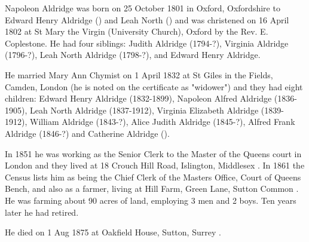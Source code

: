 
Napoleon Aldridge was born on 25 October 1801 in Oxford, Oxfordshire to Edward Henry Aldridge () and Leah North () \cite{NapoleonAldridgeBirth} and was christened on 16 April 1802 at St Mary the Virgin (University Church), Oxford by the Rev. E. Coplestone.  He had four siblings:  Judith Aldridge (1794-?), Virginia Aldridge (1796-?), Leah North Aldridge (1798-?), and Edward Henry Aldridge.

He married Mary Ann Chymist on 1 April 1832 at St Giles in the Fields, Camden, London \cite{NapoleonAldridgeMarriage}  (he is noted on the certificate as "widower") and they had eight children:  Edward Henry Aldridge (1832-1899),  Napoleon Alfred Aldridge (1836-1905), Leah North Aldridge (1837-1912), Virginia Elizabeth Aldridge (1839-1912), William Aldridge (1843-?), Alice Judith Aldridge (1845-?), Alfred Frank Aldridge (1846-?) and Catherine Aldridge ().

In 1851 he was working as the Senior Clerk to the Master of the Queens court in London and they lived at 18 Crouch Hill Road, Islington, Middlesex \cite{NapoleonAldridgeOccupation}.  In 1861 the Census lists him as being the Chief Clerk of the Masters Office, Court of Queens Bench, and also as a farmer, living at Hill Farm, Green Lane, Sutton Common \cite{NapoleonAldridgeResidence}.  He was farming about 90 acres of land, employing 3 men and 2 boys.  Ten years later he had retired.
	
He died on 1 Aug 1875 at Oakfield House, Sutton, Surrey \cite{NapoleonAldridgeDeath}.

